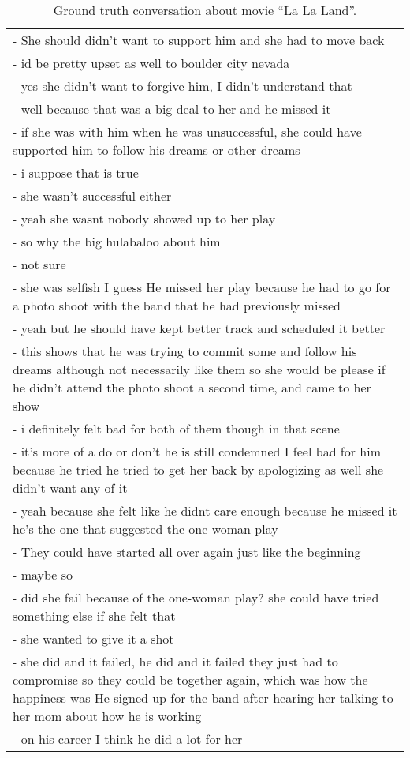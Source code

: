 \documentclass[11pt]{article}
\begin{document}
\begin{table*}[h]
\begin{tabular}{p{\textwidth}}
        - She should didn't want to support him and she had to move back \\
        - id be pretty upset as well to boulder city nevada \\
        - yes she didn't want to forgive him, I didn't understand that \\
        - well because that was a big deal to her and he missed it \\
        - if she was with him when he was unsuccessful, she could have supported him to follow his dreams or other dreams \\
        - i suppose that is true \\
        - she wasn't successful either \\
        - yeah she wasnt nobody showed up to her play \\
        - so why the big hulabaloo about him \\
        - not sure \\
        - she was selfish I guess He missed her play because he had to go for a photo shoot with the band that he had previously missed \\
        - yeah but he should have kept better track and scheduled it better \\
        - this shows that he was trying to commit some and follow his dreams although not necessarily like them so she would be please if he didn't attend the photo shoot a second time, and came to her show \\
        - i definitely felt bad for both of them though in that scene \\
        - it's more of a do or don't he is still condemned I feel bad for him because he tried he tried to get her back by apologizing as well she didn't want any of it \\
        - yeah because she felt like he didnt care enough because he missed it he's the one that suggested the one woman play \\
        - They could have started all over again just like the beginning \\
        - maybe so \\
        - did she fail because of the one-woman play? she could have tried something else if she felt that \\
        - she wanted to give it a shot \\
        - she did and it failed, he did and it failed they just had to compromise so they could be together again, which  was how the happiness was  He signed up for the band after hearing her talking to her mom about how he is working\\
        - on his career I think he did a lot for her \\
    \bottomrule
    \end{tabular}
    \caption{Ground truth conversation about movie ``La La Land''.}
    \label{tab:dialogue_lalaland}
\end{table*}
\end{document}
